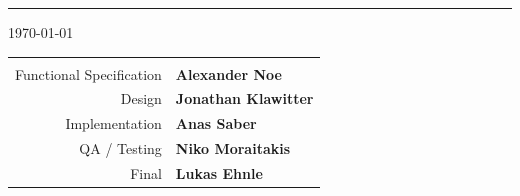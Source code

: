 \begin{titlepage}
\begin{center}
{\color{PineGreen}\hrule}
\vspace*{0.4cm}
 {\today}
 
\vspace*{0.5cm}
\normalsize



\begin{tabular}{r l}

\arrayrulecolor{PineGreen!90}
\hline
& \\
 
  	Functional Specification
&
	\textbf{Alexander Noe}
\\ 
	Design
& 
	\textbf{Jonathan Klawitter}
\\ 
	Implementation 
& 
	\textbf{Anas Saber}
\\
	QA / Testing 
&
	\textbf{Niko Moraitakis}
\\
	Final 
&	\textbf{Lukas Ehnle}\\



 
\end{tabular}


\end{center}
\end{titlepage}